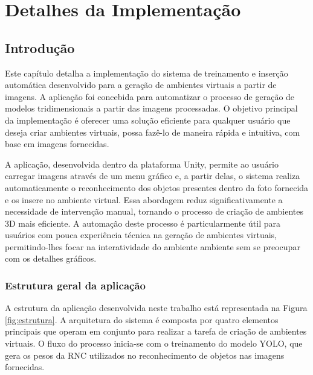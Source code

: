 \chapter{Detalhes da Implementação}

\section{Introdução}

Este capítulo detalha a implementação do sistema de treinamento e inserção automática desenvolvido para a geração de ambientes virtuais a partir de imagens. A aplicação foi concebida para automatizar o processo de geração de modelos tridimensionais a partir das imagens processadas. O objetivo principal da implementação é oferecer uma solução eficiente para qualquer usuário que deseja criar ambientes virtuais, possa fazê-lo de maneira rápida e intuitiva, com base em imagens fornecidas.

A aplicação, desenvolvida dentro da plataforma Unity, permite ao usuário carregar imagens através de um menu gráfico e, a partir delas, o sistema realiza automaticamente o reconhecimento dos objetos presentes dentro da foto fornecida e os insere no ambiente virtual. Essa abordagem reduz significativamente a necessidade de intervenção manual, tornando o processo de criação de ambientes 3D mais eficiente. A automação deste processo é particularmente útil para usuários com pouca experiência técnica na geração de ambientes virtuais, permitindo-lhes focar na interatividade do ambiente ambiente sem se preocupar com os detalhes gráficos.


\subsection{Estrutura geral da aplicação}

A estrutura da aplicação desenvolvida neste trabalho está representada na Figura \ref{fig:estrutura}. A arquitetura do sistema é composta por quatro elementos principais que operam em conjunto para realizar a tarefa de criação de ambientes virtuais. O fluxo do processo inicia-se com o treinamento do modelo YOLO, que gera os pesos da RNC utilizados no reconhecimento de objetos nas imagens fornecidas.

